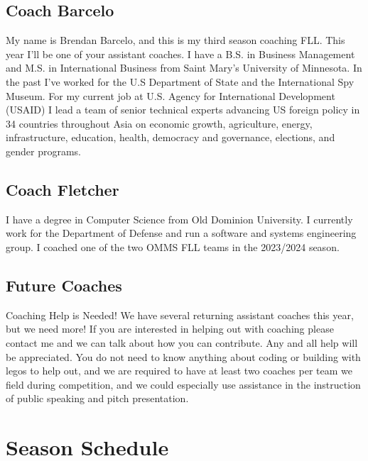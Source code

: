 \documentclass[letter]{article}
\begin{document}
\hypertarget{coach-barcelo}{%
\subsection{Coach Barcelo}\label{coach-barcelo}}

My name is Brendan Barcelo, and this is my third season coaching FLL. This year I'll be one of your assistant coaches. I have a B.S. in Business Management and M.S. in International Business from Saint Mary's University of Minnesota. In the past I've worked for the U.S Department of State and the International Spy Museum. For my current job at U.S. Agency for International Development (USAID) I lead a team of senior technical experts advancing US foreign policy in 34 countries throughout Asia on economic growth, agriculture, energy, infrastructure, education, health, democracy and governance, elections, and gender programs.

\hypertarget{coach-fletcher}{%
\subsection{Coach Fletcher}\label{coach-fletcher}}

I have a degree in Computer Science from Old Dominion University. I currently work for the Department of Defense and run a software and systems engineering group. I coached one of the two OMMS FLL teams in the 2023/2024 season.

\hypertarget{future-coaches}{%
\subsection{Future Coaches}\label{future-coaches}}

Coaching Help is Needed! We have several returning assistant coaches
this year, but we need more! If you are interested in helping out with
coaching please contact me and we can talk about how you can contribute.
Any and all help will be appreciated. You do not need to know anything about coding or building with legos to help out, and we are required to have at least two coaches per team we field during competition, and we could especially use assistance in the instruction of public speaking and pitch presentation.

\hypertarget{meeting-schedule}{%
\section{Season Schedule}\label{meeting-schedule}}
\end{document}
